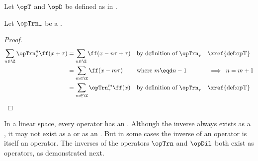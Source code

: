 \begin{example}
Let $\opT$ and $\opD$ be defined as in .
\end{example}

\begin{proposition}
\label{prop:opT_periodic}
Let $\opTrn_\tau$ be a  .
\end{proposition}
\begin{proof}
\begin{align*}
  \sum_{n\in\Z}\opTrn_\tau^n\ff(x+\tau)
    &= \sum_{n\in\Z}\ff(x-n\tau+\tau)
    && \text{by definition of $\opTrn_\tau$} && \text{\xref{def:opT}}
  \\&= \sum_{m\in\Z}\ff(x-m\tau)
    && \text{where $m\eqd n-1$}         && \implies\;n=m+1
  \\&= \sum_{m\in\Z}\opTrn_\tau^m\ff(x)
    && \text{by definition of $\opTrn_\tau$} && \text{\xref{def:opT}}
\end{align*}
\end{proof}



In a linear space, every operator has an .
Although the inverse always exists as a ,
it may not exist as a or as an .
But in some cases the inverse of an operator is itself an operator.
The inverses of the operators $\opTrn$ and $\opDil$ both exist as operators,
as demonstrated next.

